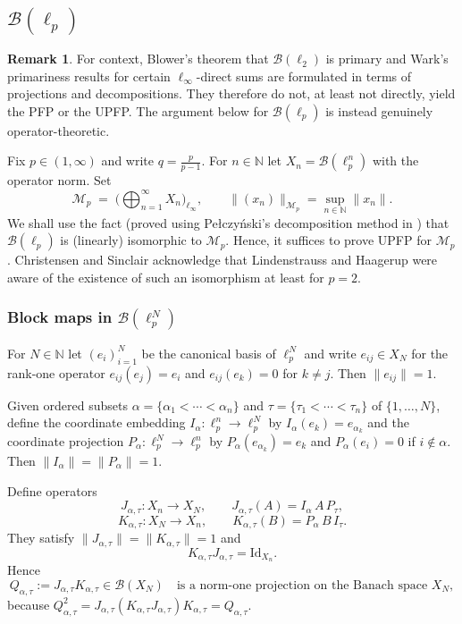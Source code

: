 \documentclass[11pt]{amsart}
\theoremstyle{plain}
\theoremstyle{definition}
\newtheorem{remark}[theorem]{Remark}
\numberwithin{equation}{section}
\newcommand{\norm}[1]{\lVert #1 \rVert}
\newcommand{\Bop}{\mathcal{B}}
\newcommand{\N}{\mathbb{N}}
\newcommand{\Id}{\mathrm{Id}}
\begin{document}
\subsection{\texorpdfstring{$\mathcal{B}(\ell_p)$}{B(lp)}}

\begin{remark}
    For context, Blower's theorem that $\Bop(\ell_2)$ is primary and Wark's primariness results for certain $\ell_\infty$-direct sums are formulated in terms of projections and decompositions. They therefore do not, at least not directly, yield the PFP or the UPFP. The argument below for $\Bop(\ell_p)$ is instead genuinely operator-theoretic.
\end{remark}

Fix $p\in(1,\infty)$ and write $q=\frac{p}{p-1}$. For $n\in\N$ let $X_n=\Bop(\ell_p^n)$ with the operator norm.
Set
\[
    \mathcal{M}_p \;=\;\Big(\bigoplus_{n=1}^\infty X_n\Big)_{\ell_\infty},
    \qquad
    \norm{(x_n)}_{\mathcal{M}_p}=\sup_{n\in\N}\norm{x_n}.
\]
We shall use the fact (proved using Pe{\l}czy\'nski's decomposition method in \cite[Section~2]{AriasFarmer})
that $\Bop(\ell_p)$ is (linearly) isomorphic to $\mathcal{M}_p$. Hence, it suffices to prove UPFP for $\mathcal{M}_p$. Christensen and Sinclair \cite{ChristensenSincliar} acknowledge that Lindenstrauss and Haagerup were aware of the existence of such an isomorphism at least for $p=2$.

\subsubsection{Block maps in $\Bop(\ell_p^N)$}
For $N\in\N$ let $(e_i)_{i=1}^N$ be the canonical basis of $\ell_p^N$ and write
$e_{ij}\in X_N$ for the rank-one operator $e_{ij}(e_j)=e_i$ and $e_{ij}(e_k)=0$ for $k\neq j$.
Then $\norm{e_{ij}}=1$.

Given ordered subsets $\alpha=\{\alpha_1<\cdots<\alpha_n\}$ and $\tau=\{\tau_1<\cdots<\tau_n\}$ of $\{1,\dots,N\}$, define
the coordinate embedding $I_\alpha\colon \ell_p^n\to\ell_p^N$ by $I_\alpha(e_k)=e_{\alpha_k}$ and the coordinate projection
$P_\alpha\colon \ell_p^N\to\ell_p^n$ by $P_\alpha(e_{\alpha_k})=e_k$ and $P_\alpha(e_i)=0$ if $i\notin\alpha$.
Then $\norm{I_\alpha}=\norm{P_\alpha}=1$.

Define operators
\[
J_{\alpha,\tau}\colon X_n\to X_N,\qquad J_{\alpha,\tau}(A)=I_\alpha\,A\,P_\tau,
\]
\[
K_{\alpha,\tau}\colon X_N\to X_n,\qquad K_{\alpha,\tau}(B)=P_\alpha\,B\,I_\tau.
\]
They satisfy $\norm{J_{\alpha,\tau}}=\norm{K_{\alpha,\tau}}=1$ and
\[
K_{\alpha,\tau}J_{\alpha,\tau}=\Id_{X_n}.
\]
Hence
\[
Q_{\alpha,\tau}:=J_{\alpha,\tau}K_{\alpha,\tau}\in\Bop(X_N)
\quad\text{is a norm-one projection on the Banach space }X_N,
\]
because $Q_{\alpha,\tau}^2=J_{\alpha,\tau}(K_{\alpha,\tau}J_{\alpha,\tau})K_{\alpha,\tau}=Q_{\alpha,\tau}$.
\end{document}
